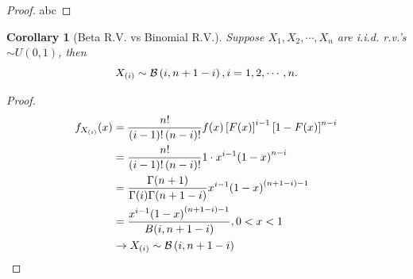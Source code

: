 \documentclass[openany,12pt]{book}
\newtheorem{corollary}{Corollary}[chapter]
\begin{document}
\begin{proof}
  abc
\end{proof}

\begin{corollary}[Beta R.V. vs Binomial R.V.]
  Suppose $X_{1}, X_{2}, \cdots,X_{n}$ are i.i.d. r.v.'s $\sim U(0,1)$, then
  \[X_{(i)}\sim\mathcal{B}\left( i,n + 1 - i \right), i = 1,2, \cdots,n.\]
\end{corollary}

\begin{proof}
  \[\begin{aligned}
      f_{X_{\left( i \right)}}(x) & = \frac{n!}{\left( i - 1 \right)!\left( n - i \right)!}f(x)\left[ F(x) \right]^{i - 1}\left[ 1 - F(x) \right]^{n - i} \\
                                  & = \frac{n!}{\left( i - 1 \right)!\left( n - i \right)!}1 \cdot x^{i - 1}{(1 - x)}^{n - i}                             \\
                                  & = \frac{\Gamma(n + 1)}{\Gamma(i)\Gamma(n + 1 - i)}x^{i - 1}{(1 - x)}^{(n + 1 - i) - 1}                                \\
                                  & = \frac{x^{i - 1}{(1 - x)}^{(n + 1 - i) - 1}}{B(i,n + 1 - i)}, 0 < x < 1                                              \\
                                  & \to X_{(i)}\sim\mathcal{B}\left( i,n + 1 - i \right)
    \end{aligned}\]
\end{proof}
\end{document}
